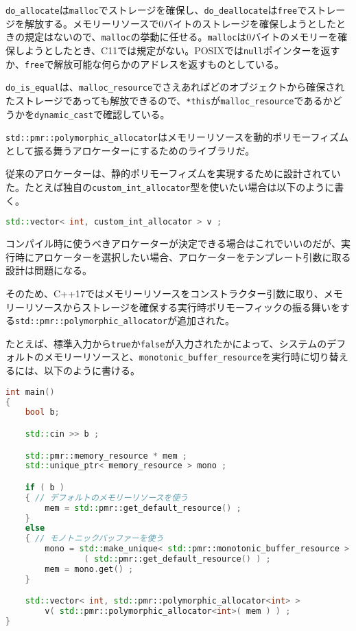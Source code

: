 \lstinline!do_allocate!は\lstinline!malloc!でストレージを確保し、\lstinline!do_deallocate!は\lstinline!free!でストレージを解放する。メモリーリソースで0バイトのストレージを確保しようとしたときの規定はないので、\lstinline!malloc!の挙動に任せる。\lstinline!malloc!は0バイトのメモリーを確保しようとしたとき、C11では規定がない。POSIXでは\lstinline!null!ポインターを返すか、\lstinline!free!で解放可能な何らかのアドレスを返すものとしている。

\lstinline!do_is_equal!は、\lstinline!malloc_resource!でさえあればどのオブジェクトから確保されたストレージであっても解放できるので、\lstinline!*this!が\lstinline!malloc_resource!であるかどうかを\lstinline!dynamic_cast!で確認している。

%

\lstinline!std::pmr::polymorphic_allocator!はメモリーリソースを動的ポリモーフィズムとして振る舞うアロケーターにするためのライブラリだ。

従来のアロケーターは、静的ポリモーフィズムを実現するために設計されていた。たとえば独自の\lstinline!custom_int_allocator!型を使いたい場合は以下のように書く。

\begin{lstlisting}[language=C++]
std::vector< int, custom_int_allocator > v ;
\end{lstlisting}

コンパイル時に使うべきアロケーターが決定できる場合はこれでいいのだが、実行時にアロケーターを選択したい場合、アロケーターをテンプレート引数に取る設計は問題になる。

そのため、C++17ではメモリーリソースをコンストラクター引数に取り、メモリーリソースからストレージを確保する実行時ポリモーフィックの振る舞いをする\lstinline!std::pmr::polymorphic_allocator!が追加された。

たとえば、標準入力から\lstinline!true!か\lstinline!false!が入力されたかによって、システムのデフォルトのメモリーリソースと、\lstinline!monotonic_buffer_resource!を実行時に切り替えるには、以下のように書ける。

\begin{lstlisting}[language=C++]
int main()
{
    bool b;

    std::cin >> b ;

    std::pmr::memory_resource * mem ;
    std::unique_ptr< memory_resource > mono ;

    if ( b )
    { // デフォルトのメモリーリソースを使う
        mem = std::pmr::get_default_resource() ;
    }
    else
    { // モノトニックバッファーを使う
        mono = std::make_unique< std::pmr::monotonic_buffer_resource >
                ( std::pmr::get_default_resource() ) ;
        mem = mono.get() ;
    }

    std::vector< int, std::pmr::polymorphic_allocator<int> >
        v( std::pmr::polymorphic_allocator<int>( mem ) ) ;
}
\end{lstlisting}

